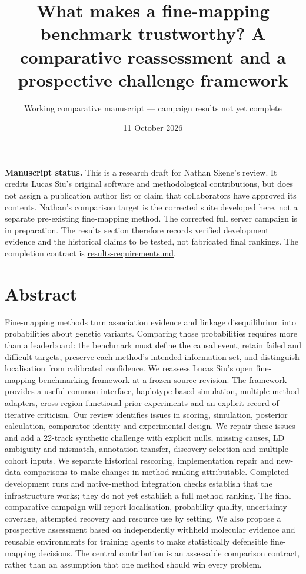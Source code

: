 \documentclass[
  british,
  10pt,
]{article}
\title{What makes a fine-mapping benchmark trustworthy? A comparative
reassessment and a prospective challenge framework}
\subtitle{Working comparative manuscript --- campaign results not yet
complete}
\author{}
\date{11 October 2026}
\begin{document}
\maketitle

\textbf{Manuscript status.} This is a research draft for Nathan Skene's
review. It credits Lucas Siu's original software and methodological
contributions, but does not assign a publication author list or claim
that collaborators have approved its contents. Nathan's comparison
target is the corrected suite developed here, not a separate
pre-existing fine-mapping method. The corrected full server campaign is
in preparation. The results section therefore records verified
development evidence and the historical claims to be tested, not
fabricated final rankings. The completion contract is
\url{results-requirements.md}.

\section{Abstract}\label{abstract}

Fine-mapping methods turn association evidence and linkage
disequilibrium into probabilities about genetic variants. Comparing
those probabilities requires more than a leaderboard: the benchmark must
define the causal event, retain failed and difficult targets, preserve
each method's intended information set, and distinguish localisation
from calibrated confidence. We reassess Lucas Siu's open fine-mapping
benchmarking framework at a frozen source revision. The framework
provides a useful common interface, haplotype-based simulation, multiple
method adapters, cross-region functional-prior experiments and an
explicit record of iterative criticism. Our review identifies issues in
scoring, simulation, posterior calculation, comparator identity and
experimental design. We repair these issues and add a 22-track synthetic
challenge with explicit nulls, missing causes, LD ambiguity and
mismatch, annotation transfer, discovery selection and multiple-cohort
inputs. We separate historical rescoring, implementation repair and
new-data comparisons to make changes in method ranking attributable.
Completed development runs and native-method integration checks
establish that the infrastructure works; they do not yet establish a
full method ranking. The final comparative campaign will report
localisation, probability quality, uncertainty coverage, attempted
recovery and resource use by setting. We also propose a prospective
assessment based on independently withheld molecular evidence and
reusable environments for training agents to make statistically
defensible fine-mapping decisions. The central contribution is an
assessable comparison contract, rather than an assumption that one
method should win every problem.
\end{document}
